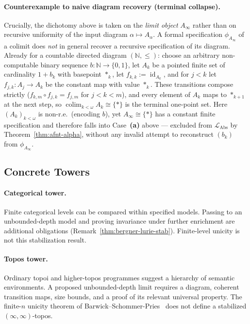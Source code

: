 \documentclass[11pt]{article}
\theoremstyle{plain}
\theoremstyle{definition}
\newcommand{\LAbs}{\mathcal{L}_{\mathrm{Abs}}}
\DeclareMathOperator{\colim}{colim}
\DeclareMathOperator{\id}{id}
\begin{document}
\paragraph{Counterexample to naive diagram recovery (terminal collapse).}
Crucially, the dichotomy above is taken on the \emph{limit object} $A_\infty$ rather than on recursive uniformity of the input diagram $\alpha \mapsto A_\alpha$. A formal specification $\phi_{A_\infty}$ of a colimit does \emph{not} in general recover a recursive specification of its diagram. Already for a countable directed diagram $(\mathbb{N}, \le)$: choose an arbitrary non-computable binary sequence $b : \mathbb{N} \to \{0, 1\}$, let $A_k$ be a pointed finite set of cardinality $1 + b_k$ with basepoint $*_k$, let $f_{k,k} := \id_{A_k}$, and for $j < k$ let $f_{j,k} : A_j \to A_k$ be the constant map with value $*_k$. These transitions compose strictly ($f_{k,m} \circ f_{j,k} = f_{j,m}$ for $j < k < m$), and every element of $A_k$ maps to $*_{k+1}$ at the next step, so $\colim_{k < \omega} A_k \cong \{*\}$ is the terminal one-point set. Here $(A_k)_{k < \omega}$ is non-r.e.\ (encoding $b$), yet $A_\infty \cong \{*\}$ has a constant finite specification and therefore falls into Case~\textbf{(a)} above — excluded from $\LAbs$ by Theorem~\ref{thm:afnt-alpha}, without any invalid attempt to reconstruct $(b_k)$ from $\phi_{A_\infty}$.

\subsection{Concrete Towers}

\paragraph{Categorical tower.} Finite categorical levels can be compared within specified models. Passing to an unbounded-depth model and proving invariance under further enrichment are additional obligations (Remark~\ref{thm:bergner-lurie-stab}). Finite-level unicity is not this stabilization result.

\paragraph{Topos tower.} Ordinary topoi and higher-topos programmes suggest a hierarchy of semantic environments. A proposed unbounded-depth limit requires a diagram, coherent transition maps, size bounds, and a proof of its relevant universal property. The finite-$n$ unicity theorem of Barwick--Schommer-Pries~\cite{BarwickSchommerPries2021} does not define a stabilized $(\infty,\infty)$-topos.
\end{document}
